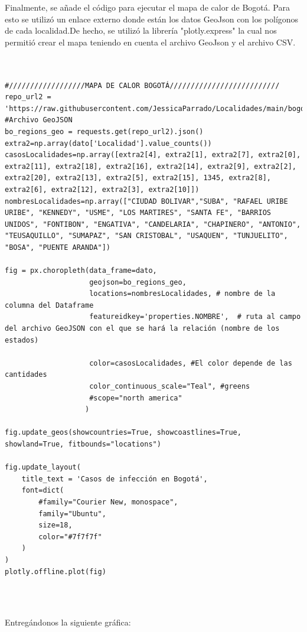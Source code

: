 \documentclass[conference,compsoc,onecolumn]{IEEEtran}
\begin{document}
Finalmente, se añade el código para ejecutar el mapa de calor de Bogotá. Para esto se utilizó un enlace externo donde están los datos GeoJson con los polígonos de cada localidad.De hecho, se utilizó la librería  "plotly.express" la cual nos permitió crear el mapa teniendo en cuenta el archivo GeoJson y el archivo CSV.
\\\

\begin{lstlisting}

#//////////////////MAPA DE CALOR BOGOTÁ//////////////////////////
repo_url2 = 'https://raw.githubusercontent.com/JessicaParrado/Localidades/main/bogota_localidades.geojson' #Archivo GeoJSON
bo_regions_geo = requests.get(repo_url2).json()
extra2=np.array(dato['Localidad'].value_counts())
casosLocalidades=np.array([extra2[4], extra2[1], extra2[7], extra2[0], extra2[11], extra2[18], extra2[16], extra2[14], extra2[9], extra2[2], extra2[20], extra2[13], extra2[5], extra2[15], 1345, extra2[8], extra2[6], extra2[12], extra2[3], extra2[10]])
nombresLocalidades=np.array(["CIUDAD BOLIVAR","SUBA", "RAFAEL URIBE URIBE", "KENNEDY", "USME", "LOS MARTIRES", "SANTA FE", "BARRIOS UNIDOS", "FONTIBON", "ENGATIVA", "CANDELARIA", "CHAPINERO", "ANTONIO", "TEUSAQUILLO", "SUMAPAZ", "SAN CRISTOBAL", "USAQUEN", "TUNJUELITO", "BOSA", "PUENTE ARANDA"])

fig = px.choropleth(data_frame=dato,
                    geojson=bo_regions_geo,
                    locations=nombresLocalidades, # nombre de la columna del Dataframe
                    featureidkey='properties.NOMBRE',  # ruta al campo del archivo GeoJSON con el que se hará la relación (nombre de los estados)

                    color=casosLocalidades, #El color depende de las cantidades
                    color_continuous_scale="Teal", #greens
                    #scope="north america"
                   )

fig.update_geos(showcountries=True, showcoastlines=True, showland=True, fitbounds="locations")

fig.update_layout(
    title_text = 'Casos de infección en Bogotá',
    font=dict(
        #family="Courier New, monospace",
        family="Ubuntu",
        size=18,
        color="#7f7f7f"
    )
)
plotly.offline.plot(fig)
\end{lstlisting}
\\\

Entregándonos la siguiente gráfica:
\\\
\end{document}
